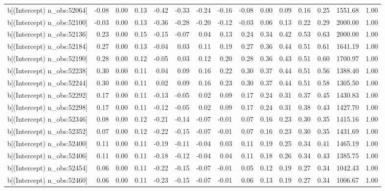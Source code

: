 \begin{table}[ht]
\begin{tabular}{rrrrrrrrrrrrrrr}
  b[(Intercept) n\_obs:52064] & -0.08 & 0.00 & 0.13 & -0.42 & -0.33 & -0.24 & -0.16 & -0.08 & 0.00 & 0.09 & 0.16 & 0.25 & 1551.68 & 1.00 \\ 
  b[(Intercept) n\_obs:52100] & -0.03 & 0.00 & 0.13 & -0.36 & -0.28 & -0.20 & -0.12 & -0.03 & 0.06 & 0.13 & 0.22 & 0.29 & 2000.00 & 1.00 \\ 
  b[(Intercept) n\_obs:52136] & 0.23 & 0.00 & 0.15 & -0.15 & -0.07 & 0.04 & 0.13 & 0.24 & 0.34 & 0.42 & 0.53 & 0.63 & 2000.00 & 1.00 \\ 
  b[(Intercept) n\_obs:52184] & 0.27 & 0.00 & 0.13 & -0.04 & 0.03 & 0.11 & 0.19 & 0.27 & 0.36 & 0.44 & 0.51 & 0.61 & 1641.19 & 1.00 \\ 
  b[(Intercept) n\_obs:52190] & 0.28 & 0.00 & 0.12 & -0.05 & 0.03 & 0.12 & 0.20 & 0.28 & 0.36 & 0.43 & 0.51 & 0.60 & 1700.97 & 1.00 \\ 
  b[(Intercept) n\_obs:52238] & 0.30 & 0.00 & 0.11 & 0.04 & 0.09 & 0.16 & 0.22 & 0.30 & 0.37 & 0.44 & 0.51 & 0.56 & 1388.40 & 1.00 \\ 
  b[(Intercept) n\_obs:52244] & 0.30 & 0.00 & 0.11 & 0.02 & 0.09 & 0.16 & 0.23 & 0.30 & 0.37 & 0.44 & 0.51 & 0.58 & 1305.50 & 1.00 \\ 
  b[(Intercept) n\_obs:52292] & 0.17 & 0.00 & 0.11 & -0.13 & -0.05 & 0.02 & 0.09 & 0.17 & 0.24 & 0.31 & 0.37 & 0.45 & 1430.83 & 1.00 \\ 
  b[(Intercept) n\_obs:52298] & 0.17 & 0.00 & 0.11 & -0.12 & -0.05 & 0.02 & 0.09 & 0.17 & 0.24 & 0.31 & 0.38 & 0.43 & 1427.70 & 1.00 \\ 
  b[(Intercept) n\_obs:52346] & 0.08 & 0.00 & 0.12 & -0.21 & -0.14 & -0.07 & -0.01 & 0.07 & 0.16 & 0.23 & 0.30 & 0.35 & 1415.16 & 1.00 \\ 
  b[(Intercept) n\_obs:52352] & 0.07 & 0.00 & 0.12 & -0.22 & -0.15 & -0.07 & -0.01 & 0.07 & 0.16 & 0.23 & 0.30 & 0.35 & 1431.69 & 1.00 \\ 
  b[(Intercept) n\_obs:52400] & 0.11 & 0.00 & 0.11 & -0.19 & -0.11 & -0.04 & 0.03 & 0.11 & 0.19 & 0.25 & 0.34 & 0.41 & 1465.19 & 1.00 \\ 
  b[(Intercept) n\_obs:52406] & 0.11 & 0.00 & 0.11 & -0.18 & -0.12 & -0.04 & 0.04 & 0.11 & 0.18 & 0.26 & 0.34 & 0.43 & 1385.75 & 1.00 \\ 
  b[(Intercept) n\_obs:52454] & 0.06 & 0.00 & 0.11 & -0.22 & -0.15 & -0.07 & -0.01 & 0.05 & 0.12 & 0.19 & 0.27 & 0.34 & 1042.43 & 1.00 \\ 
  b[(Intercept) n\_obs:52460] & 0.06 & 0.00 & 0.11 & -0.23 & -0.15 & -0.07 & -0.01 & 0.06 & 0.13 & 0.19 & 0.27 & 0.34 & 1006.67 & 1.00 \\ 

\end{tabular}
\end{table}
